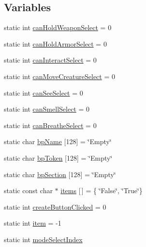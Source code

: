 \subsection*{Variables}
\begin{DoxyCompactItemize}
\item 
static int \mbox{\hyperlink{namespace_body_part_creator_aa2c4d6f6413cf4e2ffa4adaa9216f1e3}{can\+Hold\+Weapon\+Select}} = 0
\item 
static int \mbox{\hyperlink{namespace_body_part_creator_adcb219eb06333130b9eab3fe328ba296}{can\+Hold\+Armor\+Select}} = 0
\item 
static int \mbox{\hyperlink{namespace_body_part_creator_a09d4a1324f4ed616a2d9d093956e29ee}{can\+Interact\+Select}} = 0
\item 
static int \mbox{\hyperlink{namespace_body_part_creator_a231a6c07174f215b1089e7d8241123ae}{can\+Move\+Creature\+Select}} = 0
\item 
static int \mbox{\hyperlink{namespace_body_part_creator_abc03899eaeebac6414f06188b978469e}{can\+See\+Select}} = 0
\item 
static int \mbox{\hyperlink{namespace_body_part_creator_ad7c351f1cfb62b0fc2f542e3877ccd5f}{can\+Smell\+Select}} = 0
\item 
static int \mbox{\hyperlink{namespace_body_part_creator_afc3716e4345354ceec05f6a0b9159bb2}{can\+Breathe\+Select}} = 0
\item 
static char \mbox{\hyperlink{namespace_body_part_creator_a347906131734cc9049f71d6f8869e15b}{bp\+Name}} \mbox{[}128\mbox{]} = \char`\"{}Empty\char`\"{}
\item 
static char \mbox{\hyperlink{namespace_body_part_creator_a6fd9aafad0e1ee6f0ff7c435fa56444a}{bp\+Token}} \mbox{[}128\mbox{]} = \char`\"{}Empty\char`\"{}
\item 
static char \mbox{\hyperlink{namespace_body_part_creator_a943df65e69f72a750b51a1f6e9bd7467}{bp\+Section}} \mbox{[}128\mbox{]} = \char`\"{}Empty\char`\"{}
\item 
static const char $\ast$ \mbox{\hyperlink{namespace_body_part_creator_a1bf0eb929645cf00ae4d838badd689e8}{items}} \mbox{[}$\,$\mbox{]} = \{ \char`\"{}False\char`\"{}, \char`\"{}True\char`\"{}\}
\item 
static int \mbox{\hyperlink{namespace_body_part_creator_a5ca467905b40096fc8a195555cee30bc}{create\+Button\+Clicked}} = 0
\item 
static int \mbox{\hyperlink{namespace_body_part_creator_a3c0c4d20a1001e7316262c6dff315b36}{item}} = -\/1
\item 
static int \mbox{\hyperlink{namespace_body_part_creator_a8e6077047cea87bf66083ebb4805ab09}{mode\+Select\+Index}}
\end{DoxyCompactItemize}


